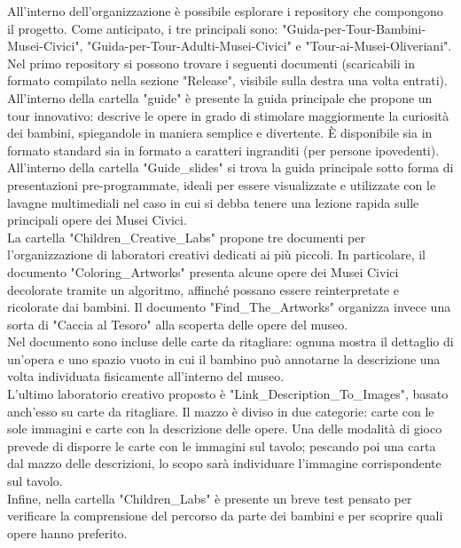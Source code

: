 \documentclass[hidelinks,12pt,a4paper]{article}
\begin{document}
\begin{flushleft}
        All'interno dell'organizzazione è possibile esplorare i repository che compongono il progetto. Come anticipato, i tre principali sono: "Guida-per-Tour-Bambini-Musei-Civici", "Guida-per-Tour-Adulti-Musei-Civici" e "Tour-ai-Musei-Oliveriani".\\
        \bigskip
        Nel primo repository si possono trovare i seguenti documenti (scaricabili in formato compilato nella sezione "Release", visibile sulla destra una volta entrati).\\
        All'interno della cartella "guide" è presente la guida principale che propone un tour innovativo: descrive le opere in grado di stimolare maggiormente la curiosità dei bambini, spiegandole in maniera semplice e divertente. È disponibile sia in formato standard sia in formato a caratteri ingranditi (per persone ipovedenti).\\
        All'interno della cartella "Guide\_slides" si trova la guida principale sotto forma di presentazioni pre-programmate, ideali per essere visualizzate e utilizzate con le lavagne multimediali nel caso in cui si debba tenere una lezione rapida sulle principali opere dei Musei Civici.\\ 
        La cartella "Children\_Creative\_Labs" propone tre documenti per l'organizzazione di laboratori creativi dedicati ai più piccoli. In particolare, il documento "Coloring\_Artworks" presenta alcune opere dei Musei Civici decolorate tramite un algoritmo, affinché possano essere reinterpretate e ricolorate dai bambini. Il documento "Find\_The\_Artworks" organizza invece una sorta di "Caccia al Tesoro" alla scoperta delle opere del museo.\\
        Nel documento sono incluse delle carte da ritagliare: ognuna mostra il dettaglio di un'opera e uno spazio vuoto in cui il bambino può annotarne la descrizione una volta individuata fisicamente all'interno del museo.\\
        L'ultimo laboratorio creativo proposto è "Link\_Description\_To\_Images", basato anch'esso su carte da ritagliare. Il mazzo è diviso in due categorie: carte con le sole immagini e carte con la descrizione delle opere. Una delle modalità di gioco prevede di disporre le carte con le immagini sul tavolo; pescando poi una carta dal mazzo delle descrizioni, lo scopo sarà individuare l'immagine corrispondente sul tavolo.\\
        Infine, nella cartella "Children\_Labs" è presente un breve test pensato per verificare la comprensione del percorso da parte dei bambini e per scoprire quali opere hanno preferito.\\

\end{flushleft}
\end{document}
